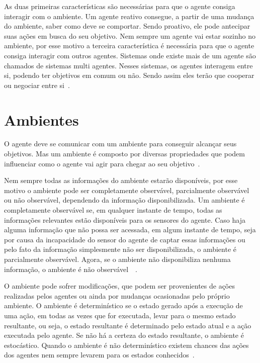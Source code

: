 As duas primeiras características são necessárias para que o agente consiga interagir com o ambiente.
Um agente reativo consegue, a partir de uma mudança do ambiente, saber como deve se comportar. Sendo proativo, ele pode antecipar suas ações em busca do seu objetivo.
Nem sempre um agente vai estar sozinho no ambiente, por esse motivo a terceira característica é necessária para que o agente consiga interagir com outros agentes. Sistemas onde existe mais de um agente são chamados de sistemas multi agentes. Nesses sistemas, os agentes interagem entre si, podendo ter objetivos em comum ou não. Sendo assim eles terão que cooperar ou negociar entre si~\cite[Capítulo 7]{intelligence2003modern}.

\section{Ambientes}

O agente deve se comunicar com um ambiente para conseguir alcançar seus objetivos. Mas um ambiente é composto por diversas propriedades que podem influenciar como o agente vai agir para chegar ao seu objetivo~\cite[Capítulo 2]{intelligence2003modern}. 

Nem sempre todas as informações do ambiente estarão disponíveis, por esse motivo o ambiente pode ser completamente observável, parcialmente observável ou não observável, dependendo da informação disponibilizada. 
Um ambiente é completamente observável se, em qualquer instante de tempo, todas as informações relevantes estão disponíveis para os sensores do agente.
Caso haja alguma informação que não possa ser acessada, em algum instante de tempo, seja por causa da incapacidade do sensor do agente de captar essas informações ou pelo fato da informação simplesmente não ser disponibilizada, o ambiente é parcialmente observável. Agora, se o ambiente não disponibiliza nenhuma informação, o ambiente é não observável~\cite[Capítulo 2]{intelligence2003modern}~\cite{agent1999}.   

O ambiente pode sofrer modificações, que podem ser provenientes de ações realizadas pelos agentes ou ainda por mudanças ocasionadas pelo próprio ambiente. O ambiente é determinístico se o estado gerado após a execução de uma ação, em todas as vezes que for executada, levar para o mesmo estado resultante, ou seja, o estado resultante é determinado pelo estado atual e a ação executada pelo agente. Se não há a certeza do estado resultante, o ambiente é estocástico. Quando o ambiente é não determinístico existem chances das ações dos agentes nem sempre levarem para os estados conhecidos~\cite[Capítulo 2]{intelligence2003modern}. 

